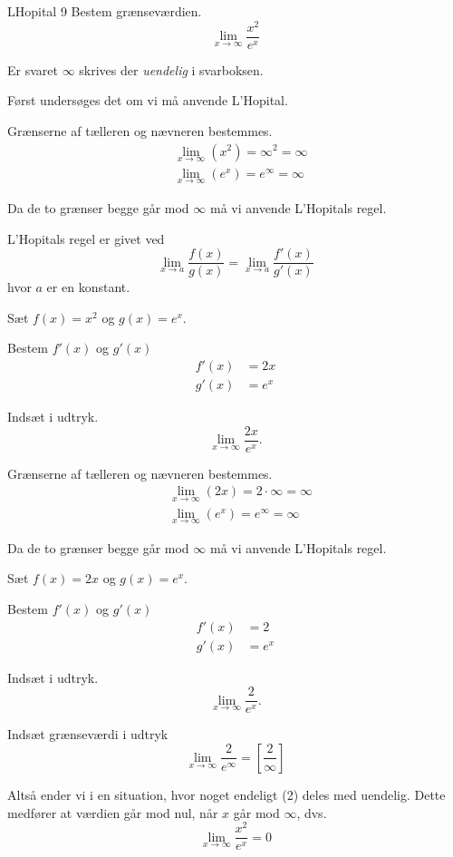\documentclass{article}
\begin{document}
\begin{exercise}{LHopital 9}
Bestem grænseværdien.
\[
\lim_{x \to \infty} \frac{x^2}{e^x}
\] 

Er svaret $\infty$ skrives der \emph{uendelig} i svarboksen.


\hint
Først undersøges det om vi må anvende L'Hopital.

\hint
Grænserne af tælleren og nævneren bestemmes.
\begin{align*}
	&\lim_{x \to \infty} (x^2) = \infty ^2 = \infty \\
	&\lim_{x \to \infty} (e^x) = e^\infty = \infty
\end{align*}

\hint
Da de to grænser begge går mod $\infty$ må vi  anvende L'Hopitals regel. 

\hint
L'Hopitals regel er givet ved
\[
\lim_{x \to a} \frac{f(x)}{g(x)} = \lim_{x \to a} \frac{f'(x)}{g'(x)} 
\]
hvor $a$  er en konstant.

\hint
Sæt $f(x) = x^2$ og $g(x) = e^x$. 

\hint
Bestem $f'(x)$ og $g'(x)$
\begin{align*}
	f'(x) &= 2x \\
	g'(x) &= e^x
\end{align*}

\hint
Indsæt i udtryk.
\[
\lim_{x \to \infty} \frac{2x}{e^x}.
\]

\hint
Grænserne af tælleren og nævneren bestemmes.
\begin{align*}
	&\lim_{x \to \infty} (2x) = 2 \cdot \infty  = \infty \\
	&\lim_{x \to \infty} (e^x) = e^\infty = \infty
\end{align*}

\hint
Da de to grænser begge går mod $\infty$ må vi  anvende L'Hopitals regel. 

	\hint
Sæt $f(x) = 2x$ og $g(x) = e^x$. 

\hint
Bestem $f'(x)$ og $g'(x)$
\begin{align*}
	f'(x) &= 2 \\
	g'(x) &= e^x
\end{align*}

\hint
Indsæt i udtryk.
\[
\lim_{x \to \infty} \frac{2}{e^x}.
\]


\hint
Indsæt grænseværdi i udtryk
\[
\lim_{x \to \infty} \frac{2}{e^\infty}  = \left[ \frac{2}{\infty}  \right] 
\]

\hint
Altså ender vi i en situation, hvor noget endeligt (2) deles med uendelig. Dette medfører at værdien går mod nul, når $x$ går mod $\infty$, dvs.
\[
\lim_{x \to \infty} \frac{x^2}{e^x} = 0
\]

\end{exercise}
\end{document}
